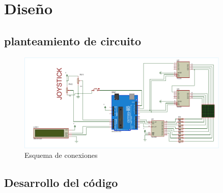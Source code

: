 \section{Diseño}

\subsection{planteamiento de circuito}
\begin{figure}[h!]
    \centering
    \includegraphics[width=0.9\textwidth]{Diagramas/xfcolor_cropped.pdf}
    \caption{Esquema de conexiones}
    \label{fig:esquema}
\end{figure}
\subsection{Desarrollo del código}
